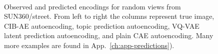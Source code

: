 \begin{figure}
    \begin{center}
    \\
    \end{center}
    \caption{Observed \protect{} and predicted encodings \protect{} for random views from SUN360/street. From left to right the columns represent true image, CIB-AE autoencoding, topic prediction autoencoding, VQ-VAE latent prediction autoencoding, and plain CAE autoencoding. Many more examples are found in App.~\ref{ch:app-predictions}).
    }
    \label{fig:encoding-strip}
\end{figure}

